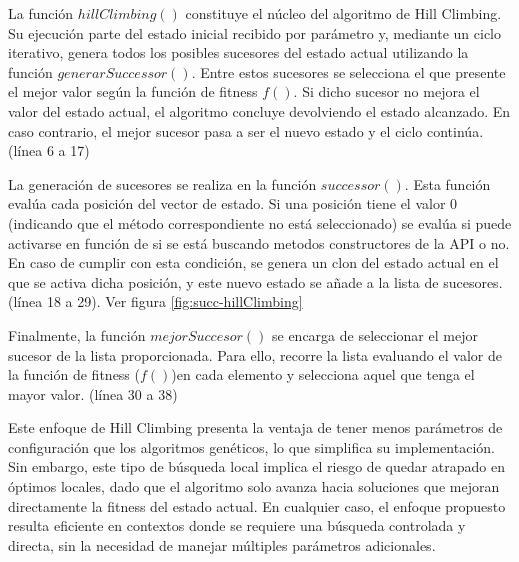 La función $hillClimbing()$ constituye el núcleo del algoritmo de Hill Climbing. Su ejecución parte del estado inicial recibido por parámetro y, 
mediante un ciclo iterativo, genera todos los posibles sucesores del estado actual utilizando la función $generarSuccessor()$. 
Entre estos sucesores se selecciona el que presente el mejor valor según la función de fitness $f()$. Si dicho sucesor no mejora el valor del estado actual,
el algoritmo concluye devolviendo el estado alcanzado. En caso contrario, el mejor sucesor pasa a ser el nuevo estado y el ciclo continúa. (línea 6 a 17)

La generación de sucesores se realiza en la función $successor()$. Esta función evalúa cada posición del vector de estado. Si una posición tiene el valor 0 
(indicando que el método correspondiente no está seleccionado) se evalúa si puede activarse en función de si se está buscando metodos constructores de la API o no. 
En caso de cumplir con esta condición, se genera un clon del estado actual en el que se activa dicha posición, y este nuevo estado se añade a la lista de sucesores.
 (línea 18 a 29). Ver figura \ref{fig:succ-hillClimbing}

Finalmente, la función $mejorSuccesor()$ se encarga de seleccionar el mejor sucesor de la lista proporcionada.
Para ello, recorre la lista evaluando el valor de la función de fitness ($f()$)en cada elemento y selecciona aquel que tenga el mayor valor. (línea 30 a 38)

Este enfoque de Hill Climbing presenta la ventaja de tener menos parámetros de configuración que los algoritmos genéticos, 
lo que simplifica su implementación. Sin embargo, este tipo de búsqueda local implica el riesgo de quedar atrapado en óptimos locales, 
dado que el algoritmo solo avanza hacia soluciones que mejoran directamente la fitness del estado actual. 
En cualquier caso, el enfoque propuesto resulta eficiente en contextos donde se requiere una búsqueda controlada y directa, 
sin la necesidad de manejar múltiples parámetros adicionales.





